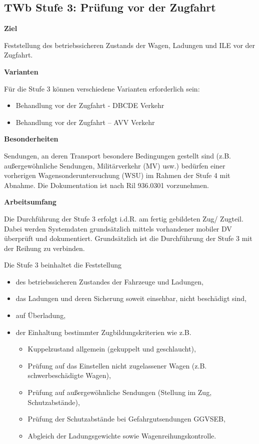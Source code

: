 \subsection{TWb Stufe 3: Prüfung vor der Zugfahrt}
\textbf{Ziel} \par
Feststellung des betriebssicheren Zustands der Wagen,
Ladungen und ILE vor der Zugfahrt.\par
\textbf{Varianten} \par
Für die Stufe 3 können verschiedene Varianten erforderlich sein:
\begin{itemize}
    \item Behandlung vor der Zugfahrt - DBCDE Verkehr
    \item Behandlung vor der Zugfahrt – AVV Verkehr
\end{itemize}
\textbf{Besonderheiten} \par
Sendungen, an deren Transport besondere Bedingungen gestellt sind (z.B. außergewöhnliche Sendungen, Militärverkehr (MV) usw.) bedürfen einer vorherigen Wagensonderuntersuchung
(WSU) im Rahmen der Stufe 4 mit Abnahme. Die Dokumentation ist nach Ril 936.0301 vorzunehmen.\par
\textbf{Arbeitsumfang} \par
Die Durchführung der Stufe 3 erfolgt i.d.R. am fertig gebildeten Zug/ Zugteil. Dabei werden Systemdaten grundsätzlich mittels vorhandener mobiler DV überprüft und dokumentiert. Grundsätzlich ist die Durchführung der Stufe 3 mit der Reihung zu verbinden.\par
Die Stufe 3 beinhaltet die Feststellung
\begin{itemize}
    \item des betriebssicheren Zustandes der Fahrzeuge und Ladungen,
    \item das Ladungen und deren Sicherung soweit einsehbar, nicht beschädigt sind,
    \item auf Überladung,
    \item der Einhaltung bestimmter Zugbildungskriterien wie z.B.
    \begin{itemize}
        \item Kuppelzustand allgemein (gekuppelt und geschlaucht),
        \item Prüfung auf das Einstellen nicht zugelassener Wagen (z.B. schwerbeschädigte Wagen),
        \item Prüfung auf außergewöhnliche Sendungen (Stellung im Zug, Schutzabstände),
        \item Prüfung der Schutzabstände bei Gefahrgutsendungen GGVSEB,
        \item Abgleich der Ladungsgewichte sowie Wagenreihungskontrolle.
    \end{itemize}
\end{itemize}

